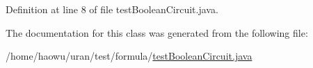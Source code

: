 Definition at line 8 of file test\+Boolean\+Circuit.\+java.



The documentation for this class was generated from the following file\+:\begin{DoxyCompactItemize}
\item 
/home/haowu/uran/test/formula/\hyperlink{test_boolean_circuit_8java}{test\+Boolean\+Circuit.\+java}\end{DoxyCompactItemize}
